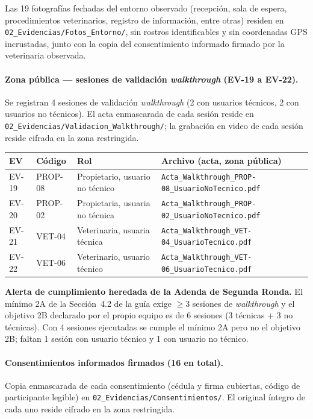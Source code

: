 \documentclass[journal,onecolumn]{IEEEtran}
\begin{document}
	Las 19 fotografías fechadas del entorno observado (recepción, sala de
	espera, procedimientos veterinarios, registro de información, entre otras)
	residen en \texttt{02\_Evidencias/Fotos\_Entorno/}, sin rostros
	identificables y sin coordenadas GPS incrustadas, junto con la copia del
	consentimiento informado firmado por la veterinaria observada.
	
	\paragraph{Zona pública --- sesiones de validación \emph{walkthrough} (EV-19 a EV-22).}
	Se registran 4 sesiones de validación \emph{walkthrough} (2 con usuarios
	técnicos, 2 con usuarios no técnicos). El acta enmascarada de cada sesión
	reside en \texttt{02\_Evidencias/Validacion\_Walkthrough/}; la grabación en
	video de cada sesión reside cifrada en la zona restringida.
	
	\begin{table}[H]
		\centering
		\small
		\begin{tabularx}{\textwidth}{@{}l l X X@{}}
			\toprule
			\textbf{EV} & \textbf{Código} & \textbf{Rol} & \textbf{Archivo (acta, zona pública)} \\
			\midrule
			EV-19 & PROP-08 & Propietario, usuario no técnico & \texttt{Acta\_Walkthrough\_PROP-08\_UsuarioNoTecnico.pdf} \\
			EV-20 & PROP-02 & Propietaria, usuaria no técnica & \texttt{Acta\_Walkthrough\_PROP-02\_UsuarioNoTecnico.pdf} \\
			EV-21 & VET-04 & Veterinaria, usuaria técnica & \texttt{Acta\_Walkthrough\_VET-04\_UsuarioTecnico.pdf} \\
			EV-22 & VET-06 & Veterinario, usuario técnico & \texttt{Acta\_Walkthrough\_VET-06\_UsuarioTecnico.pdf} \\
			\bottomrule
		\end{tabularx}
	\end{table}
	
	\textbf{Alerta de cumplimiento heredada de la Adenda de Segunda Ronda.} El
	mínimo 2A de la Sección~4.2 de la guía exige $\geq 3$ sesiones de
	\emph{walkthrough} y el objetivo 2B declarado por el propio equipo es de 6
	sesiones (3 técnicas + 3 no técnicas). Con 4 sesiones ejecutadas se cumple
	el mínimo 2A pero no el objetivo 2B; faltan 1 sesión con usuario técnico y
	1 con usuario no técnico.
	
	\paragraph{Consentimientos informados firmados (16 en total).}
	Copia enmascarada de cada consentimiento (cédula y firma cubiertas, código
	de participante legible) en \texttt{02\_Evidencias/Consentimientos/}. El
	original íntegro de cada uno reside cifrado en la zona restringida.
	
\end{document}
